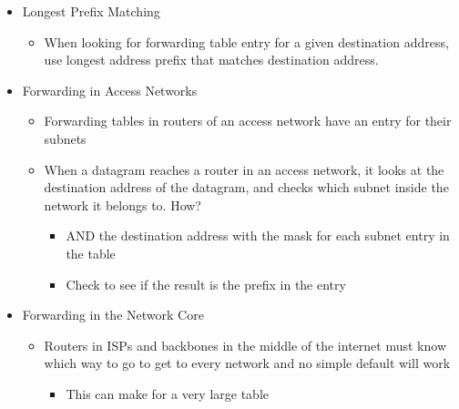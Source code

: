 \begin{itemize}
  \item Longest Prefix Matching

    \begin{itemize}

      \item When looking for forwarding table entry for a given destination address, use longest address prefix that matches destination address.

    \end{itemize}

  \item Forwarding in Access Networks

    \begin{itemize}

      \item Forwarding tables in routers of an access network have an entry for their subnets

      \item When a datagram reaches a router in an access network, it looks at the destination address of the datagram, and checks which subnet inside the network it belongs to. How?

        \begin{itemize}

          \item AND the destination address with the mask for each subnet entry in the table

          \item Check to see if the result is the prefix in the entry

        \end{itemize}

    \end{itemize}

  \item Forwarding in the Network Core

    \begin{itemize}

      \item Routers in ISPs and backbones in the middle of the internet must know which way to go to get to every network and no simple default will work

        \begin{itemize}

          \item This can make for a very large table

            \begin{itemize}


\end{itemize}
\end{itemize}
\end{itemize}
\end{itemize}
